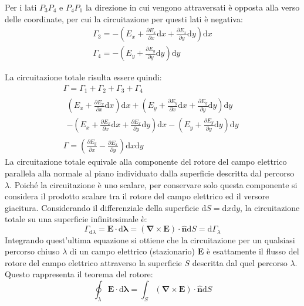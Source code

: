\documentclass{article}
\newcommand{\vect}[1]{\boldsymbol{\mathbf{#1}}}
\newcommand{\df}{\mathrm{d}}
\numberwithin{equation}{subsection}
\begin{document}
Per i lati $P_3P_4$ e $P_4P_1$ la direzione in cui vengono attraversati è opposta alla verso delle coordinate, per cui la circuitazione per questi lati è negativa:
\begin{gather*}
    \Gamma_3=-\left(E_x+\displaystyle\frac{\partial E_x}{\partial x}\df  x+\frac{\partial E_x}{\partial y}\df  y\right)\df  x\\
    \Gamma_4=-\left(E_y+\displaystyle\frac{\partial E_y}{\partial y}\df  y\right)\df  y
\end{gather*} 

La circuitazione totale risulta essere quindi:
\begin{gather*}
    \Gamma=\Gamma_1+\Gamma_2+\Gamma_3+\Gamma_4\\
    \begin{matrix}
        \displaystyle\left(E_x+\frac{\partial E_x}{\partial x}\df  x\right)\df  x+\left(E_y+\frac{\partial E_y}{\partial x}\df  x+\frac{\partial E_y}{\partial y}\df  y\right)\df  y\\
        \displaystyle-\left(E_x+\frac{\partial E_x}{\partial x}\df  x+\frac{\partial E_x}{\partial y}\df  y\right)\df  x-\left(E_y+\frac{\partial E_y}{\partial y}\df  y\right)\df  y
    \end{matrix}\\
    \Gamma=\left(\displaystyle\frac{\partial E_y}{\partial x}-\frac{\partial E_x}{\partial y}\right)\df x\df y
\end{gather*}
La circuitazione totale equivale alla componente del rotore del campo elettrico parallela alla normale al piano individuato dalla superficie descritta dal percorso $\lambda$. 
Poiché la circuitazione è uno scalare, per conservare solo questa componente si considera il prodotto scalare tra il rotore del campo elettrico ed il versore giacitura. 
Considerando il differenziale della superficie $\df S=\df x\df y$, la circuitazione totale su una superficie infinitesimale è:
\begin{equation*}
    \Gamma_{\df\lambda}=\vect{E}\cdot \df\vect{\lambda}=({\vect\nabla}\times\vect{E})\cdot \hat{\vect{n}}\df S=\df\Gamma_\lambda
\end{equation*}
Integrando quest'ultima equazione si ottiene che la circuitazione per un qualsiasi percorso chiuso $\lambda$ di un campo elettrico (stazionario) $\vect{E}$ è esattamente il 
flusso del rotore del campo elettrico attraverso la superficie $S$ descritta dal quel percorso $\lambda$. Questo rappresenta il teorema del rotore: 
\begin{equation}
    \displaystyle\oint_{\lambda}\vect{E}\cdot \df\vect{\lambda}=\int_S({\vect\nabla}\times\vect{E})\cdot\hat{\vect{n}}\df S
\end{equation}
\end{document}
